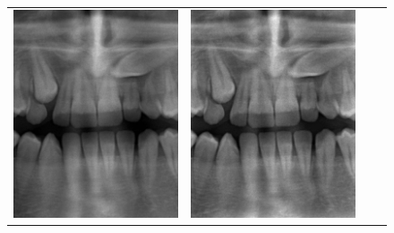 \documentclass[a4paper,10pt]{article}
\begin{document}
\begin{figure}[!h]

\begin{tabular}{cccc}
\includegraphics[width=80mm]{cropped.png} & \includegraphics[width=80mm]{homo.png} \\

\end{tabular}
\end{figure}
\end{document}
